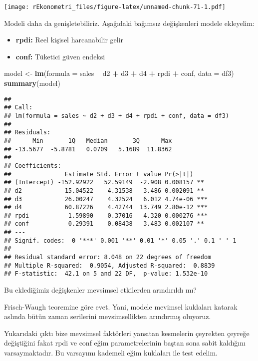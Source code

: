 \documentclass[
]{book}
\newenvironment{Shaded}{\begin{snugshade}}{\end{snugshade}}
\newcommand{\DataTypeTok}[1]{\textcolor[rgb]{0.13,0.29,0.53}{#1}}
\newcommand{\KeywordTok}[1]{\textcolor[rgb]{0.13,0.29,0.53}{\textbf{#1}}}
\newcommand{\NormalTok}[1]{#1}
\newcommand{\OperatorTok}[1]{\textcolor[rgb]{0.81,0.36,0.00}{\textbf{#1}}}
\newcommand{\StringTok}[1]{\textcolor[rgb]{0.31,0.60,0.02}{#1}}
\begin{document}
\texttt{[image: rEkonometri\_files/figure-latex/unnamed-chunk-71-1.pdf]}

Modeli daha da genişletebiliriz. Aşağıdaki bağımsız değişkenleri modele ekleyelim:

\begin{itemize}
\item
  \textbf{rpdi:} Reel kişisel harcanabilir gelir
\item
  \textbf{conf:} Tüketici güven endeksi
\end{itemize}

\begin{Shaded}
\begin{Highlighting}[]
\NormalTok{model <-}\StringTok{ }\KeywordTok{lm}\NormalTok{(}\DataTypeTok{formula =}\NormalTok{ sales }\OperatorTok{~}\StringTok{ }\NormalTok{d2 }\OperatorTok{+}\StringTok{ }\NormalTok{d3 }\OperatorTok{+}\StringTok{ }\NormalTok{d4 }\OperatorTok{+}\StringTok{ }\NormalTok{rpdi }\OperatorTok{+}\StringTok{ }\NormalTok{conf, }\DataTypeTok{data =}\NormalTok{ df3)}
\KeywordTok{summary}\NormalTok{(model)}
\end{Highlighting}
\end{Shaded}

\begin{verbatim}
## 
## Call:
## lm(formula = sales ~ d2 + d3 + d4 + rpdi + conf, data = df3)
## 
## Residuals:
##      Min       1Q   Median       3Q      Max 
## -13.5677  -5.8781   0.0709   5.1689  11.8362 
## 
## Coefficients:
##               Estimate Std. Error t value Pr(>|t|)    
## (Intercept) -152.92922   52.59149  -2.908 0.008157 ** 
## d2            15.04522    4.31538   3.486 0.002091 ** 
## d3            26.00247    4.32524   6.012 4.74e-06 ***
## d4            60.87226    4.42744  13.749 2.80e-12 ***
## rpdi           1.59890    0.37016   4.320 0.000276 ***
## conf           0.29391    0.08438   3.483 0.002107 ** 
## ---
## Signif. codes:  0 '***' 0.001 '**' 0.01 '*' 0.05 '.' 0.1 ' ' 1
## 
## Residual standard error: 8.048 on 22 degrees of freedom
## Multiple R-squared:  0.9054, Adjusted R-squared:  0.8839 
## F-statistic:  42.1 on 5 and 22 DF,  p-value: 1.532e-10
\end{verbatim}

Bu eklediğimiz değişkenler mevsimsel etkilerden arındırıldı mı?

Frisch-Waugh teoremine göre evet. Yani, modele mevimsel kuklaları katarak aslında bütün zaman serilerini mevsimsellikten arındırmış oluyoruz.

Yukarıdaki çıktı bize mevsimsel faktörleri yansıtan kesmelerin çeyrekten çeyreğe değiştiğini fakat rpdi ve conf eğim parametrelerinin baştan sona sabit kaldığını varsaymaktadır. Bu varsayımı kademeli eğim kuklaları ile test edelim.
\end{document}
